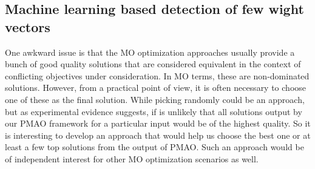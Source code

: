 \documentclass[a4paper,fleqn, review]{cas-dc}
\begin{document}
\subsection{Machine learning based detection of few wight vectors}
One awkward issue is that the MO optimization approaches usually provide a bunch of good quality solutions that are considered equivalent in the context of conflicting objectives under consideration. In MO terms, these are non-dominated solutions. However, from a practical point of view, it is often necessary to choose one of these as the final solution. While picking randomly could be an approach, but as experimental evidence suggests, if is unlikely that all solutions output by our PMAO framework for a particular input would be of the highest quality. So it is interesting to develop an approach that would help us choose the best one or at least a few top solutions from the output of PMAO. Such an approach would be of independent interest for other MO optimization scenarios as well.
\end{document}
